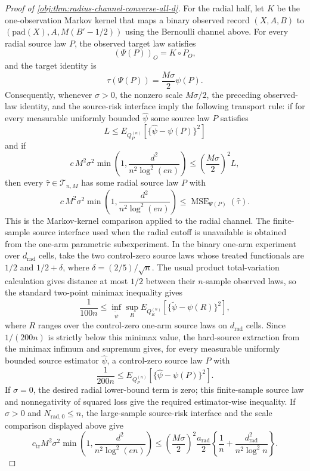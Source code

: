 \begin{proof}[Proof of \cref{obj:thm:radius-channel-converse-all-d}]
For the radial half, let \(K\) be the one-observation Markov kernel that maps a binary observed record \((X,A,B)\) to \((\mathrm{pad}(X),A,M(B'-1/2))\) using the Bernoulli channel above.  For every radial source law \(P\), the observed target law satisfies
\[
(\Psi(P))_O=K\circ P_O,
\]
and the target identity is
\[
\tau(\Psi(P))=\frac{M\sigma}{2}\psi(P).
\]
Consequently, whenever \(\sigma>0\), the nonzero scale \(M\sigma/2\), the preceding observed-law identity, and the source-risk interface imply the following transport rule: if for every measurable uniformly bounded \(\widehat\psi\) some source law \(P\) satisfies
\[
L\le
E_{Q_P^{(n)}}\left[\{\widehat\psi-\psi(P)\}^2\right]
\]
and if
\[
c\,M^2\sigma^2
\min\left(1,\frac{d^2}{n^2\log^2(en)}\right)
\le
\left(\frac{M\sigma}{2}\right)^2L,
\]
then every \(\widehat\tau\in\mathcal T_{n,M}\) has some radial source law \(P\) with
\[
c\,M^2\sigma^2
\min\left(1,\frac{d^2}{n^2\log^2(en)}\right)
\le
\operatorname{MSE}_{\Psi(P)}(\widehat\tau).
\]
This is the Markov-kernel comparison applied to the radial channel.  The finite-sample source interface used when the radial cutoff is unavailable is obtained from the one-arm parametric subexperiment.  In the binary one-arm experiment over \(d_{\mathrm{rad}}\) cells, take the two control-zero source laws whose treated functionals are \(1/2\) and \(1/2+\delta\), where \(\delta=(2/5)/\sqrt n\).  The usual product total-variation calculation gives distance at most \(1/2\) between their \(n\)-sample observed laws, so the standard two-point minimax inequality gives
\[
\frac{1}{100n}
\le
\inf_{\widetilde\psi}
\sup_{R}
E_{Q_R^{(n)}}
\left[
\{\widetilde\psi-\psi(R)\}^2
\right],
\]
where \(R\) ranges over the control-zero one-arm source laws on \(d_{\mathrm{rad}}\) cells.  Since \(1/(200n)\) is strictly below this minimax value, the hard-source extraction from the minimax infimum and supremum gives, for every measurable uniformly bounded source estimator \(\widehat\psi\), a control-zero source law \(P\) with
\[
\frac{1}{200n}
\le
E_{Q_P^{(n)}}
\left[
\{\widehat\psi-\psi(P)\}^2
\right].
\]
If \(\sigma=0\), the desired radial lower-bound term is zero; this finite-sample source law and nonnegativity of squared loss give the required estimator-wise inequality.  If \(\sigma>0\) and \(N_{\mathrm{rad},0}\le n\), the large-sample source-risk interface and the scale comparison displayed above give
\[
c_{\mathrm{tr}}M^2\sigma^2
\min\left(1,\frac{d^2}{n^2\log^2(en)}\right)
\le
\left(\frac{M\sigma}{2}\right)^2
\frac{a_{\mathrm{rad}}}{2}
\left\{\frac1n+\frac{d_{\mathrm{rad}}^2}{n^2\log^2 n}\right\}.
\]
\end{proof}
